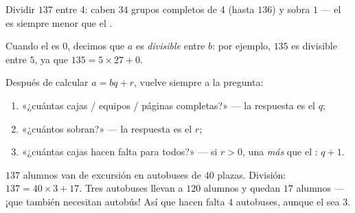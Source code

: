 \begin{omfigure}

{\small Dividir $137$ entre $4$: caben $34$ grupos completos de $4$
(hasta $136$) y sobra $1$ --- el  es siempre
menor que el .}
\end{omfigure}

\begin{definition}[Divisible]\label{def:g6:wholes:divisible}
Cuando el  es $0$, decimos que $a$ es
\emph{divisible} entre $b$: por ejemplo, $135$ es
divisible entre $5$, ya que $135 = 5 \times 27 + 0$.
\end{definition}

\begin{method}\label{met:g6:wholes:problems}
Después de calcular $a = bq + r$, vuelve siempre a la pregunta:
\begin{enumerate}
  \item «¿cuántas cajas / equipos / páginas completas?» --- la respuesta es el
         $q$;
  \item «¿cuántos sobran?» --- la respuesta es el 
        $r$;
  \item «¿cuántas cajas hacen falta para todos?» --- si $r > 0$, una
        \emph{más} que el : $q + 1$.
\end{enumerate}
\end{method}

\begin{example}\label{ex:g6:wholes:bus}
$137$ alumnos van de excursión en autobuses de $40$ plazas. División:
$137 = 40 \times 3 + 17$. Tres autobuses llevan a $120$ alumnos y quedan $17$
alumnos --- ¡que también necesitan autobús! Así que hacen falta $4$ autobuses, aunque
el  sea $3$.
\end{example}

